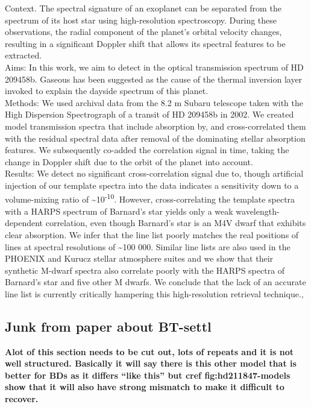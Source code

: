 \citet{hoeijmakers_search_2015}
{Context.
The spectral signature of an exoplanet can be separated from the spectrum of its host star using high-resolution spectroscopy.
During these observations, the radial component of the planet's orbital velocity changes, resulting in a significant Doppler shift that allows its spectral features to be extracted. \\
     Aims: In this work, we aim to detect in the optical transmission spectrum of HD 209458b.
Gaseous has been suggested as the cause of the thermal inversion layer invoked to explain the dayside spectrum of this planet. \\
     Methods: We used archival data from the 8.2 m Subaru telescope taken with the High Dispersion Spectrograph of a transit of HD 209458b in 2002.
We created model transmission spectra that include absorption by, and cross-correlated them with the residual spectral data after removal of the dominating stellar absorption features.
We subsequently co-added the correlation signal in time, taking the change in Doppler shift due to the orbit of the planet into account. \\
     Results: We detect no significant cross-correlation signal due to, though artificial injection of our template spectra into the data indicates a sensitivity down to a volume-mixing ratio of \textasciitilde{}10\textsuperscript{-10}.
However, cross-correlating the template spectra with a {HARPS} spectrum of Barnard's star yields only a weak wavelength-dependent correlation, even though Barnard's star is an M4V dwarf that exhibits clear  absorption.
We infer that the line list poorly matches the real positions of lines at spectral resolutions of \textasciitilde{}100 000.
Similar line lists are also used in the {PHOENIX} and Kurucz stellar atmosphere suites and we show that their synthetic M-dwarf spectra also correlate poorly with the {HARPS} spectra of Barnard's star and five other M dwarfs.
We conclude that the lack of an accurate line list is currently critically hampering this high-resolution retrieval technique.},




\subsection{Junk from paper about BT-settl}


\textbf{Alot of this section needs to be cut out, lots of repeats and it is not well structured.
Basically it will say there is this other model that is better for BDs as it differs ``like this'' but \textbf{cref {fig:hd211847-models}} show that it will also have strong mismatch to make it difficult to recover.}

